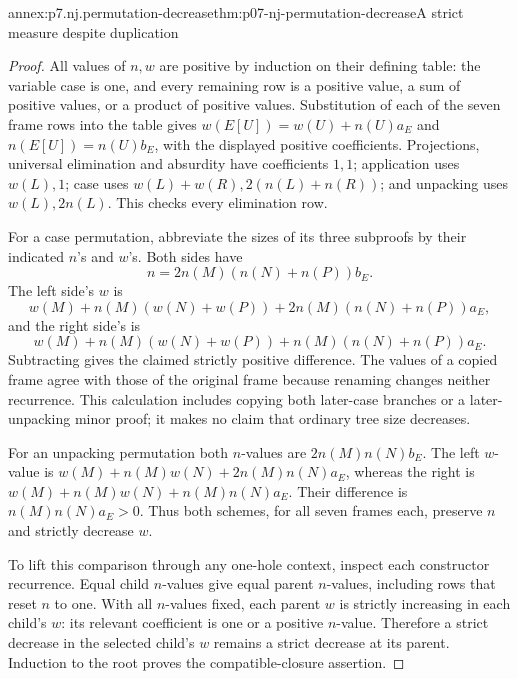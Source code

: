 \begin{annexitem}{annex:p7.nj.permutation-decrease}{thm:p07-nj-permutation-decrease}{A strict measure despite duplication}
\begin{proof}
All values of \(n,w\) are positive by induction on their
defining table: the variable case is one, and every remaining
row is a positive value, a sum of positive values, or a
product of positive values. Substitution of each of the
seven frame rows into the table gives
\(w(E[U])=w(U)+n(U)a_E\) and
\(n(E[U])=n(U)b_E\), with the displayed positive
coefficients. Projections, universal elimination and absurdity
have coefficients \(1,1\); application uses \(w(L),1\);
case uses \(w(L)+w(R),2(n(L)+n(R))\); and unpacking
uses \(w(L),2n(L)\). This checks every elimination row.

For a case permutation, abbreviate the sizes of its three
subproofs by their indicated \(n\)'s and \(w\)'s. Both
sides have
\[
             n=2n(M)(n(N)+n(P))b_E.
\]
The left side's \(w\) is
\[
 w(M)+n(M)(w(N)+w(P))
       +2n(M)(n(N)+n(P))a_E,
\]
and the right side's is
\[
 w(M)+n(M)(w(N)+w(P))
       +n(M)(n(N)+n(P))a_E.
\]
Subtracting gives the claimed strictly positive difference.
The values of a copied frame agree with those of the original
frame because renaming changes neither recurrence. This
calculation includes copying both later-case branches or a
later-unpacking minor proof; it makes no claim that ordinary
tree size decreases.

For an unpacking permutation both \(n\)-values are
\(2n(M)n(N)b_E\). The left \(w\)-value is
\(w(M)+n(M)w(N)+2n(M)n(N)a_E\), whereas the right is
\(w(M)+n(M)w(N)+n(M)n(N)a_E\).
Their difference is \(n(M)n(N)a_E>0\). Thus both
schemes, for all seven frames each, preserve \(n\) and
strictly decrease \(w\).

To lift this comparison through any one-hole context, inspect
each constructor recurrence. Equal child \(n\)-values give
equal parent \(n\)-values, including rows that reset \(n\)
to one. With all \(n\)-values fixed, each parent \(w\)
is strictly increasing in each child's \(w\): its relevant
coefficient is one or a positive \(n\)-value. Therefore a
strict decrease in the selected child's \(w\) remains a
strict decrease at its parent. Induction to the root proves
the compatible-closure assertion.
\end{proof}
\end{annexitem}

